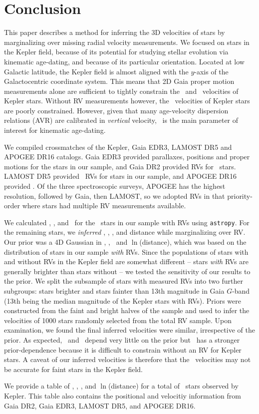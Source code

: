 \section{Conclusion}

This paper describes a method for inferring the 3D velocities of stars by
marginalizing over missing radial velocity measurements.
We focused on stars in the Kepler field, because of its potential for studying
stellar evolution via kinematic age-dating, and because of its particular
orientation.
Located at low Galactic latitude, the Kepler field is almost aligned with the
$y$-axis of the Galactocentric coordinate system.
This means that 2D Gaia proper motion measurements alone are sufficient to
tightly constrain the \vx\ and \vz\ velocities of Kepler stars.
Without RV measurements however, the \vy\ velocities  of Kepler stars are
poorly constrained.
However, given that many age-velocity dispersion relations (AVR) are
calibrated in {\it vertical} velocity, \vz\ is the main parameter of interest
for kinematic age-dating.

We compiled crossmatches of the Kepler, Gaia EDR3, LAMOST DR5 and APOGEE DR16
catalogs.
Gaia EDR3 provided parallaxes, positions and proper motions for the stars in
our sample, and Gaia DR2 provided RVs for \ngaia\ stars.
LAMOST DR5 provided \nlamost\ RVs for stars in our sample, and APOGEE DR16
provided \napogee.
Of the three spectroscopic surveys, APOGEE has the highest resolution,
followed by Gaia, then LAMOST, so we adopted RVs in that priority-order
where stars had multiple RV measurements available.

We calculated \vx, \vy, and \vz\ for the \nrv\ stars in our sample with RVs
using {\tt astropy}.
For the remaining stars, we {\it inferred} \vx, \vy, \vz, and distance while
marginalizing over RV.
Our prior was a 4D Gaussian in \vx, \vy, \vz\ and $\ln$(distance), which was
based on the distribution of stars in our sample {\it with} RVs.
Since the populations of stars with and without RVs in the Kepler field are
somewhat different -- stars {\it with} RVs are generally brighter than stars
without -- we tested the sensitivity of our results to the prior.
We split the subsample of stars with measured RVs into two further subgroups:
stars brighter and stars fainter than 13th magnitude in Gaia $G$-band (13th
being the median magnitude of the Kepler stars with RVs).
Priors were constructed from the faint and bright halves of the sample and
used to infer the velocities of 1000 stars randomly selected from the total RV
sample.
Upon examination, we found the final inferred velocities were similar,
irrespective of the prior.
As expected, \vx\ and \vz\ depend very little on the prior but \vy\ has a
stronger prior-dependence because it is difficult to constrain without an RV
for Kepler stars.
A caveat of our inferred velocities is therefore that the \vy\ velocities may
not be accurate for faint stars in the Kepler field.

We provide a table of \vx, \vy, \vz, and $\ln$(distance) for a total of
\nstars\ stars observed by Kepler.
This table also contains the positional and velocitiy information from Gaia
DR2, Gaia EDR3, LAMOST DR5, and APOGEE DR16.
